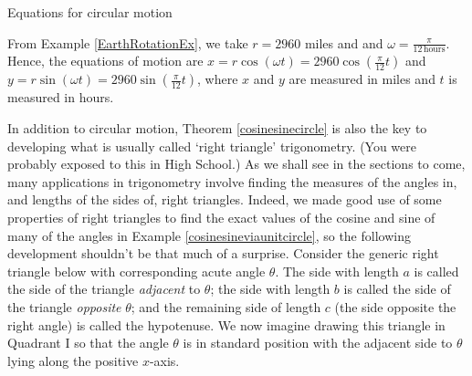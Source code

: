 \pagebreak


\medskip

\begin{minipage}{0.9\textwidth}
\begin{center}
\end{center}
\captionsetup{type=figure}
\caption{Equations for circular motion}\label{fig:circle27}
\end{minipage}

\medskip


{From Example \ref{EarthRotationEx}, we take $r = 2960$ miles and and $\omega = \frac{\pi}{12 \, \text{hours}}$.  Hence, the equations of motion are $x =  r \cos(\omega t) = 2960 \cos\left(\frac{\pi}{12} t\right)$ and  $y =  r \sin(\omega t) = 2960 \sin\left(\frac{\pi}{12} t\right)$, where $x$ and $y$ are measured in miles and $t$ is measured in hours.}

\medskip

In addition to circular motion, Theorem \ref{cosinesinecircle} is also the key to developing what is usually called `right triangle' trigonometry. (You were probably exposed to this in High School.)  As we shall see in the sections to come, many applications in trigonometry involve finding the measures of the angles in, and lengths of the sides of, right triangles.  Indeed, we made good use of some properties of right triangles to find the exact values of the cosine and sine of many of the angles in Example \ref{cosinesineviaunitcircle}, so the following development shouldn't be that much of a surprise.  Consider the generic right triangle below with corresponding acute angle $\theta$. The side with length $a$ is called the side of the triangle \emph{adjacent} to  $\theta$; the side with length $b$ is called the side of the triangle \emph{opposite} $\theta$; and the remaining side of length $c$ (the side opposite the right angle) is called the hypotenuse. We now imagine drawing this triangle in Quadrant I so that the angle $\theta$ is in standard position with the adjacent side to $\theta$ lying along the positive $x$-axis. 

